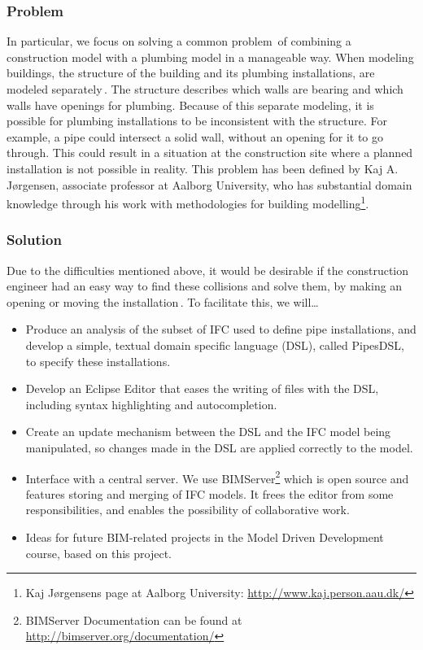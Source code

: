 \subsubsection{Problem}
In particular, we focus on solving a common problem\,\cite[pp. 20]{jorgensen10} of combining a construction model with a plumbing model in a manageable way. When modeling buildings, the structure of the building and its plumbing installations, are modeled separately\,\cite[pp. 19--20]{jorgensen10}. The structure describes which walls are bearing and which walls have openings for plumbing.  Because of this separate modeling, it is possible for plumbing installations to be inconsistent with the structure. For example, a pipe could intersect a solid wall, without an opening for it to go through. This could result in a situation at the construction site where a planned installation is not possible in reality. This problem has been defined by Kaj A. Jørgensen, associate professor at Aalborg University, who has substantial domain knowledge through his work with methodologies for building modelling\footnote{Kaj Jørgensens page at Aalborg University: \url{http://www.kaj.person.aau.dk/}}.

\subsubsection{Solution}
Due to the difficulties mentioned above, it would be desirable if the construction engineer had an easy way to find these collisions and solve them, by making an opening or moving the installation\,\cite{jorgensen12}. To facilitate this, we will…
\begin{itemize}
\item Produce an analysis of the subset of IFC used to define pipe installations, and develop a simple, textual domain specific language (DSL), called PipesDSL, to specify these installations.
\item Develop an Eclipse Editor that eases the writing of files with the DSL, including syntax highlighting and autocompletion.
\item Create an update mechanism between the DSL and the IFC model being manipulated, so changes made in the DSL are applied correctly to the model.
\item Interface with a central server. We use BIMServer\footnote{BIMServer Documentation can be found at \url{http://bimserver.org/documentation/}} which is open source and features storing and merging of IFC models. It frees the editor from some responsibilities, and enables the possibility of collaborative work.
\item Ideas for future BIM-related projects in the Model Driven Development course, based on this project.
\end{itemize}

